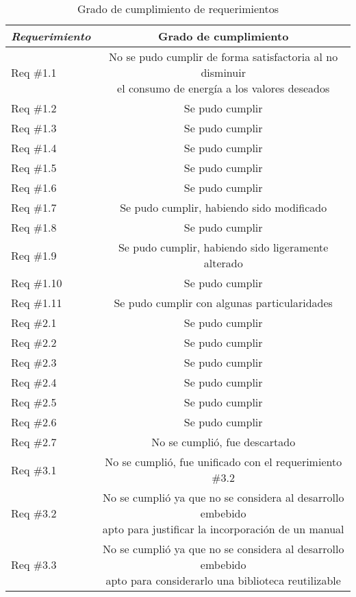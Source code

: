 \begin{table}[H]
	\centering
	\caption[\textit{Requerimientos}]{Grado de cumplimiento de requerimientos}
	\begin{tabular}{l c}    
		\toprule
		\textbf{\textit{Requerimiento}} 	 & \textbf{Grado de cumplimiento} \\
		\midrule
		Req \#1.1 & \makecell{No se pudo cumplir de forma satisfactoria al no disminuir \\  el consumo de energía a los valores deseados}    \\		
		Req \#1.2 & Se pudo cumplir    \\	
		Req \#1.3 &   Se pudo cumplir   \\	
		Req \#1.4 &   Se pudo cumplir   \\	
		Req \#1.5 &  Se pudo cumplir    \\	
		Req \#1.6 &  Se pudo cumplir    \\	
		Req \#1.7 &  Se pudo cumplir, habiendo sido modificado   \\	
		Req \#1.8 &  Se pudo cumplir    \\	
		Req \#1.9 &  Se pudo cumplir, habiendo sido ligeramente alterado   \\	
		Req \#1.10 & Se pudo cumplir     \\	
		Req \#1.11 &  Se pudo cumplir con algunas particularidades   \\	
		Req \#2.1 &  Se pudo cumplir    \\	
		Req \#2.2 &   Se pudo cumplir   \\	
		Req \#2.3 & Se pudo cumplir     \\	
		Req \#2.4 &  Se pudo cumplir    \\	
		Req \#2.5 & Se pudo cumplir     \\	
		Req \#2.6 &  Se pudo cumplir    \\	
		Req \#2.7 &  No se cumplió, fue descartado   \\	
		Req \#3.1 &  No se cumplió, fue unificado con el requerimiento \#3.2   \\	
		Req \#3.2 &  \makecell{No se cumplió ya que no se considera al desarrollo embebido \\ apto para justificar la incorporación de un manual}  \\	
		Req \#3.3 &  \makecell{No se cumplió ya que no se considera al desarrollo embebido \\ apto para considerarlo una biblioteca reutilizable}  \\	
		\bottomrule
		\hline
	\end{tabular}
	\label{tab:requerimientos}
\end{table}

